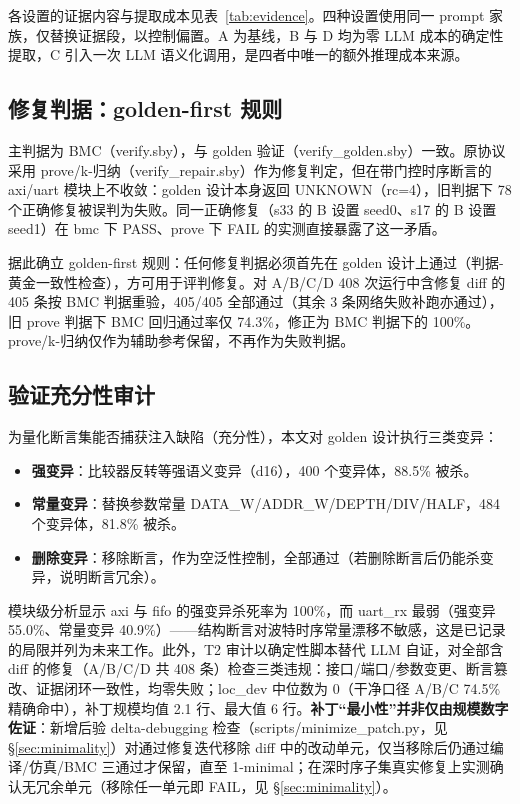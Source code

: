\documentclass[journal]{IEEEtran}
\begin{document}
各设置的证据内容与提取成本见表~\ref{tab:evidence}。四种设置使用同一 prompt 家族，仅替换证据段，以控制偏置。A 为基线，B 与 D 均为零 LLM 成本的确定性提取，C 引入一次 LLM 语义化调用，是四者中唯一的额外推理成本来源。

\subsection{修复判据：golden-first 规则}

主判据为 BMC（verify.sby），与 golden 验证（verify\_golden.sby）一致。原协议采用 prove/k-归纳（verify\_repair.sby）作为修复判定，但在带门控时序断言的 axi/uart 模块上不收敛：golden 设计本身返回 UNKNOWN（rc=4），旧判据下 78 个正确修复被误判为失败。同一正确修复（s33 的 B 设置 seed0、s17 的 B 设置 seed1）在 bmc 下 PASS、prove 下 FAIL 的实测直接暴露了这一矛盾。

据此确立 golden-first 规则：任何修复判据必须首先在 golden 设计上通过（判据-黄金一致性检查），方可用于评判修复。对 A/B/C/D 408 次运行中含修复 diff 的 405 条按 BMC 判据重验，405/405 全部通过（其余 3 条网络失败补跑亦通过），旧 prove 判据下 BMC 回归通过率仅 74.3\%，修正为 BMC 判据下的 100\%。prove/k-归纳仅作为辅助参考保留，不再作为失败判据。

\subsection{验证充分性审计}

为量化断言集能否捕获注入缺陷（充分性），本文对 golden 设计执行三类变异：
\begin{itemize}
\item \textbf{强变异}：比较器反转等强语义变异（d16），400 个变异体，88.5\% 被杀。
\item \textbf{常量变异}：替换参数常量 DATA\_W/ADDR\_W/DEPTH/DIV/HALF，484 个变异体，81.8\% 被杀。
\item \textbf{删除变异}：移除断言，作为空泛性控制，全部通过（若删除断言后仍能杀变异，说明断言冗余）。
\end{itemize}

模块级分析显示 axi 与 fifo 的强变异杀死率为 100\%，而 uart\_rx 最弱（强变异 55.0\%、常量变异 40.9\%）——结构断言对波特时序常量漂移不敏感，这是已记录的局限并列为未来工作。此外，T2 审计以确定性脚本替代 LLM 自证，对全部含 diff 的修复（A/B/C/D 共 408 条）检查三类违规：接口/端口/参数变更、断言篡改、证据闭环一致性，均零失败；loc\_dev 中位数为 0（干净口径 A/B/C 74.5\% 精确命中），补丁规模均值 2.1 行、最大值 6 行。\textbf{补丁“最小性”并非仅由规模数字佐证}：新增后验 delta-debugging 检查（scripts/minimize\_patch.py，见 \S\ref{sec:minimality}）对通过修复迭代移除 diff 中的改动单元，仅当移除后仍通过编译/仿真/BMC 三通过才保留，直至 1-minimal；在深时序子集真实修复上实测确认无冗余单元（移除任一单元即 FAIL，见 \S\ref{sec:minimality}）。
\end{document}
